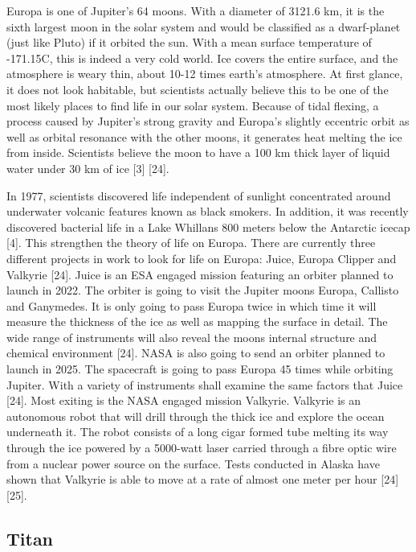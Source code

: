Europa is one of Jupiter's 64 moons.
With a diameter of 3121.6 km, it is the sixth largest moon in the solar system and would be classified as a dwarf-planet (just like Pluto) if it orbited the sun.
With a mean surface temperature of -171.15\degree C, this is indeed a very cold world.
Ice covers the entire surface, and the atmosphere is weary thin, about 10-12 times earth's atmosphere.
At first glance, it does not look habitable, but scientists actually believe this to be one of the most likely places to find life in our solar system.
Because of tidal flexing, a process caused by Jupiter’s strong gravity and Europa’s slightly eccentric orbit as well as orbital resonance with the other moons, it generates heat melting the ice from inside.
Scientists believe the moon to have a 100 km thick layer of liquid water under 30 km of ice [3] [24].
 
In 1977, scientists discovered life independent of sunlight concentrated around underwater volcanic features known as black smokers.
In addition, it was recently discovered bacterial life in a Lake Whillans 800 meters below the Antarctic icecap [4]. This strengthen the theory of life on Europa.
There are currently three different projects in work to look for life on Europa: Juice, Europa Clipper and Valkyrie [24].
Juice is an ESA engaged mission featuring an orbiter planned to launch in 2022.
The orbiter is going to visit the Jupiter moons Europa, Callisto and Ganymedes.
It is only going to pass Europa twice in which time it will measure the thickness of the ice as well as mapping the surface in detail.
The wide range of instruments will also reveal the moons internal structure and chemical environment [24].
NASA is also going to send an orbiter planned to launch in 2025.
The spacecraft is going to pass Europa 45 times while orbiting Jupiter.
With a variety of instruments shall examine the same factors that Juice [24].
Most exiting is the NASA engaged mission Valkyrie.
Valkyrie is an autonomous robot that will drill through the thick ice and explore the ocean underneath it.
The robot consists of a long cigar formed tube melting its way through the ice powered by a 5000-watt laser carried through a fibre optic wire from a nuclear power source on the surface.
Tests conducted in Alaska have shown that Valkyrie is able to move at a rate of almost one meter per hour [24] [25].

\subsection*{Titan}
 
